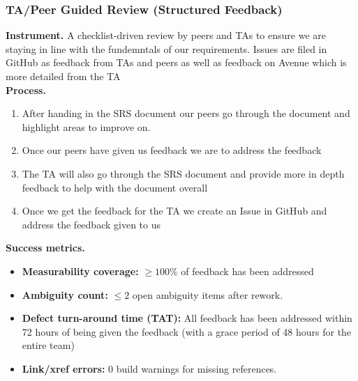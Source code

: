 \documentclass[12pt, titlepage]{article}
\begin{document}
\subsubsection*{TA/Peer Guided Review (Structured Feedback)}
\textbf{Instrument.} A checklist-driven review by peers and TAs to ensure we are staying in line with the fundemntals of our requirements. Issues are filed in GitHub as feedback from TAs and peers as well as feedback on Avenue which is more detailed from the TA\\
\textbf{Process.}
\begin{enumerate}
  \item After handing in the SRS document our peers go through the document and highlight areas to improve on.
  \item Once our peers have given us feedback we are to address the feedback
  \item The TA will also go through the SRS document and provide more in depth feedback to help with the document overall
  \item Once we get the feedback for the TA we create an Issue in GitHub and address the feedback given to us
\end{enumerate}
\textbf{Success metrics.}
\begin{itemize}
  \item \textbf{Measurability coverage:} $\geq 100\%$ of feedback has been addressed
  \item \textbf{Ambiguity count:} \(\leq 2\) open ambiguity items after rework.
  \item \textbf{Defect turn-around time (TAT):} All feedback has been addressed within 72 hours of being given the feedback (with a grace period of 48 hours for the entire team)
  \item \textbf{Link/xref errors:} $0$ build warnings for missing references.
\end{itemize}
\end{document}
